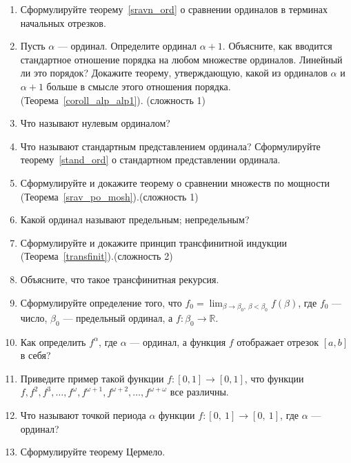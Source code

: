 \documentclass[12pt,oneside]{article}
\theoremstyle{definition}
\begin{document}
\begin{enumerate}
\item Сформулируйте теорему~\ref{sravn_ord} о сравнении ординалов в терминах начальных отрезков.

\item Пусть $\alpha$ --- ординал. Определите ординал $\alpha + 1$. Объясните, как вводится стандартное отношение порядка на любом множестве ординалов. Линейный ли это порядок? Докажите теорему, утверждающую, какой из ординалов $\alpha$ и $\alpha + 1$ больше в смысле этого отношения порядка. (Теорема~\ref{coroll_alp_alp1}). (сложность 1)

\item Что называют нулевым ординалом?

\item Что называют стандартным представлением ординала? Сформулируйте теорему~\ref{stand_ord} о стандартном представлении ординала.

\item Сформулируйте и докажите теорему о сравнении множеств по мощности (Теорема~\ref{srav_po_mosh}).(сложность 1)

\item Какой ординал называют предельным; непредельным?

\item Сформулируйте и докажите принцип трансфинитной индукции (Теорема~\ref{transfinit}).(сложность 2)

\item Объясните, что такое трансфинитная рекурсия.

\item Сформулируйте определение того, что $f_0 = \lim_{\beta \rightarrow\beta_0,\ \beta < \beta_0}f(\beta)$, где $f_0$ --- число, $\beta_0$ --- предельный ординал, а $f\colon \beta_0\to\mathbb{R}$.

\item Как определить $f^{\alpha}$, где $\alpha$ --- ординал, а функция $f$ отображает отрезок $[a,b]$ в себя?

\item Приведите пример такой функции $f\colon [0,1]\to [0,1]$, что функции\\ $f, f^2, f^3, \dots, f^\omega, f^{\omega+1}, f^{\omega+2},\dots, f^{\omega+\omega}$ все различны.

\item Что называют точкой периода $\alpha$ функции $f: [0,\ 1] \longrightarrow [0,\ 1]$, где $\alpha$ --- ординал?

\item Сформулируйте теорему Цермело.


\end{enumerate}
\end{document}
